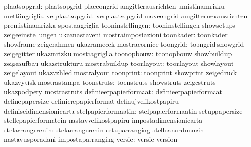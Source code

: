                     plaatsopgrid: plaatsopgrid                     placeongrid
                                  amgitterausrichten               umistinamrizku
                                  mettiingriglia
                 verplaatsopgrid: verplaatsopgrid                  moveongrid
                                  amgitterneuausrichten            premistinamrizku
                                  spostaagriglia
                tooninstellingen: tooninstellingen                 showsetups
                                  zeigeeinstellungen               ukaznastaveni
                                  mostraimpostazioni
                       toonkader: toonkader                        showframe
                                  zeigerahmen                      ukazramecek
                                  mostracornice
                        toongrid: toongrid                         showgrid
                                  zeigegitter                      ukazmrizku
                                  mostragriglia
                      toonopbouw: toonopbouw                       showbuildup
                                  zeigeaufbau                      ukazstrukturu
                                  mostrabuildup                    %
                      toonlayout: toonlayout                       showlayout
                                  zeigelayout                      ukazvzhled
                                  mostralyout
                       toonprint: toonprint                        showprint
                                  zeigedruck                       ukazvytisk
                                  mostrastampa
                      toonstruts: toonstruts                       showstruts
                                  zeigestruts                      ukazpodpery
                                  mostrastruts
          definieerpapierformaat: definieerpapierformaat           definepapersize
                                  definierepapierformat            definujvelikostpapiru
                                  definiscidimensionicarta
             stelpapierformaatin: stelpapierformaatin              setuppapersize
                                  stellepapierformatein            nastavvelikostpapiru
                                  impostadimensionicarta
                stelarrangerenin: stelarrangerenin                 setuparranging
                                  stelleanordnenein                nastavusporadani
                                  impostaparranging                %
                          versie: versie                           version
